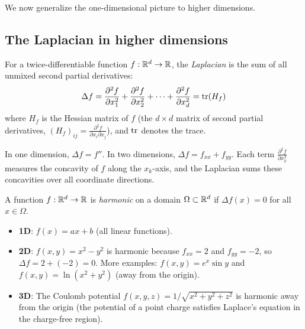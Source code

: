 \begin{notechapter}
We now generalize the one-dimensional picture to higher dimensions.

\subsection{The Laplacian in higher dimensions}

\begin{definition}[Laplacian in $\R^d$]
\label{harmonic-functions:def:cont_laplacian}
For a twice-differentiable function $f: \mathbb{R}^d \to \mathbb{R}$, the \emph{Laplacian}
is the sum of all unmixed second partial derivatives:
\begin{equation}
\Delta f = \frac{\partial^2 f}{\partial x_1^2}
         + \frac{\partial^2 f}{\partial x_2^2}
         + \cdots
         + \frac{\partial^2 f}{\partial x_d^2}
         = \operatorname{tr}(H_f)
\end{equation}
where $H_f$ is the Hessian matrix of $f$ (the $d \times d$ matrix of second
partial derivatives, $(H_f)_{ij} = \frac{\partial^2 f}{\partial x_i
\partial x_j}$), and $\operatorname{tr}$ denotes the trace.
\end{definition}

In one dimension, $\Delta f = f''$. In two dimensions,
$\Delta f = f_{xx} + f_{yy}$. Each term $\frac{\partial^2 f}{\partial x_k^2}$
measures the concavity of $f$ along the $x_k$-axis, and the Laplacian sums
these concavities over all coordinate directions.

\begin{definition}
\label{harmonic-functions:def:harmonic_cont}
A function $f: \mathbb{R}^d \to \mathbb{R}$ is \emph{harmonic} on a domain
$\Omega \subset \mathbb{R}^d$ if $\Delta f(x) = 0$ for all $x \in \Omega$.
\end{definition}

\begin{example}
\label{harmonic-functions:ex:harmonic_examples}
\leavevmode
\begin{itemize}
    \item \textbf{1D}: $f(x) = ax + b$ (all linear functions).
    \item \textbf{2D}: $f(x,y) = x^2 - y^2$ is harmonic because
          $f_{xx} = 2$ and $f_{yy} = -2$, so $\Delta f = 2 + (-2) = 0$.
          More examples: $f(x,y) = e^x \sin y$ and
          $f(x,y) = \ln(x^2 + y^2)$ (away from the origin).
    \item \textbf{3D}: The Coulomb potential
          $f(x,y,z) = 1/\sqrt{x^2 + y^2 + z^2}$ is harmonic away from the
          origin (the potential of a point charge satisfies Laplace's
          equation in the charge-free region).
\end{itemize}
\end{example}


\end{notechapter}
